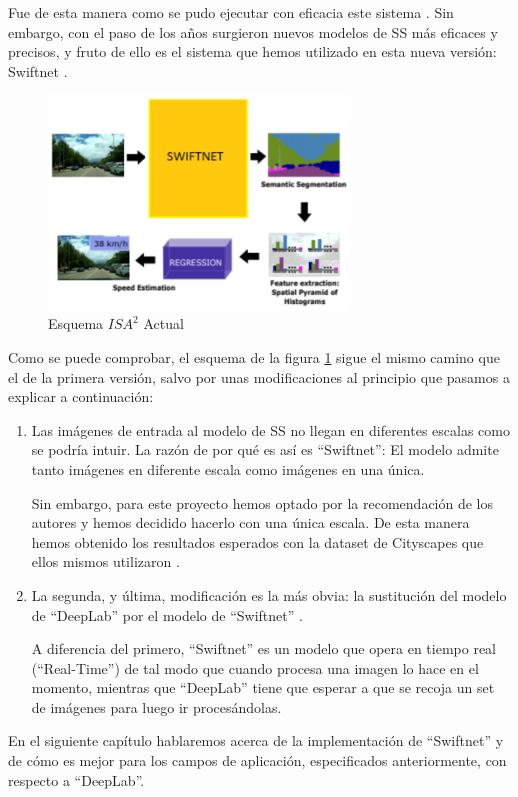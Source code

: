 Fue de esta manera como se pudo ejecutar con eficacia este sistema \cite{isa2}. Sin embargo, con el paso de los años surgieron nuevos modelos de \ac{SS} más eficaces y precisos, y fruto de ello es el sistema que hemos utilizado en esta nueva versión: Swiftnet \cite{swiftnet}.


\begin{figure}[H]
  \centering
  \includegraphics[width=8cm]{Figuras/Figura_Esquema_ISA2_Version_2.eps}
  \caption{Esquema $ISA^{2}$ Actual}
    \label{fig:Isa_v2}
\end{figure}


Como se puede comprobar, el esquema de la figura \ref{fig:Isa_v2} sigue el mismo camino que el de la primera versión, salvo por unas modificaciones al principio que pasamos a explicar a continuación:

\begin{enumerate}

\item Las imágenes de entrada al modelo de \ac{SS} no llegan en diferentes escalas como se podría intuir. La razón de por qué es así es ``Swiftnet'': El modelo admite tanto imágenes en diferente escala como imágenes en una única.


Sin embargo, para este proyecto hemos optado por la recomendación de los autores \cite{github_swiftnet} y hemos decidido hacerlo con una única escala. De esta manera hemos obtenido los resultados esperados con la dataset de Cityscapes \cite{cityscapes} que ellos mismos utilizaron \cite{swiftnet}.

\item La segunda, y última, modificación es la más obvia: la sustitución del modelo de ``DeepLab'' \cite{deeplab} por el modelo de ``Swiftnet'' \cite{swiftnet}.

A diferencia del primero, ``Swiftnet'' es un modelo que opera en tiempo real (``Real-Time'') de tal modo que cuando procesa una imagen lo hace en el momento, mientras que ``DeepLab'' tiene que esperar a que se recoja un set de imágenes para luego ir procesándolas.

\end{enumerate}


En el siguiente capítulo hablaremos acerca de la implementación de ``Swiftnet'' y de cómo es mejor para los campos de aplicación, especificados anteriormente, con respecto a ``DeepLab''.